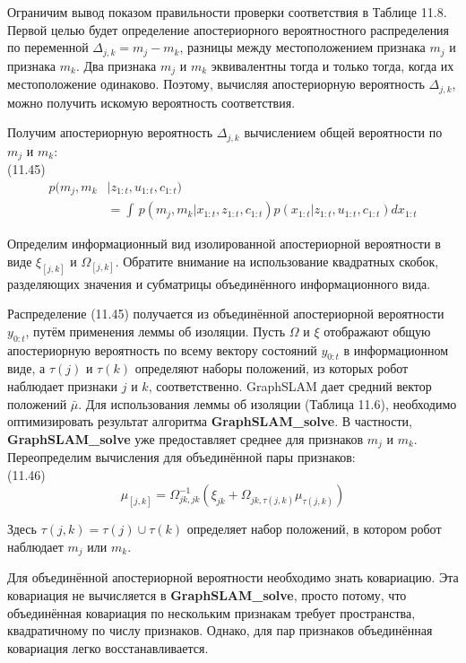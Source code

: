\documentclass[10pt,a4paper]{article}
\begin{document}
Ограничим вывод показом правильности проверки соответствия в Таблице 11.8. Первой целью будет определение апостериорного вероятностного распределения по переменной $\varDelta_{j,k}=m_j-m_k$, разницы между местоположением признака $m_j$ и признака $m_k$. Два признака $m_j$ и $m_k$ эквивалентны тогда и только тогда, когда их местоположение одинаково. Поэтому, вычисляя апостериорную вероятность $\varDelta_{j,k}$, можно получить искомую вероятность соответствия.

Получим апостериорную вероятность $\varDelta_{j,k}$ вычислением общей вероятности по $m_j$ и $m_k$:\\

(11.45)
\begin{equation*}
\begin{split}
p(m_j,m_k&|z_{1:t},u_{1:t},c_{1:t})\\
&=\int\,p(m_j,m_k|x_{1:t},z_{1:t},c_{1:t})p(x_{1:t}|z_{1:t},u_{1:t},c_{1:t})dx_{1:t}
\end{split}
\end{equation*}

Определим информационный вид изолированной апостериорной вероятности в виде $\xi_{[j,k]}$ и $\varOmega_{[j,k]}$. Обратите внимание на использование квадратных скобок, разделяющих значения и субматрицы объединённого информационного вида.

Распределение (11.45) получается из объединённой апостериорной вероятности $y_{0:t}$, путём применения леммы об изоляции. Пусть $\varOmega$ и $\xi$ отображают общую апостериорную вероятность по всему вектору состояний $y_{0:t}$ в информационном виде, а $\tau(j)$ и $\tau(k)$ определяют наборы положений, из которых робот наблюдает признаки $j$ и $k$, соответственно. GraphSLAM дает средний вектор положений $\bar{\mu}$. Для использования леммы об изоляции (Таблица 11.6), необходимо оптимизировать результат алгоритма \textbf{GraphSLAM\_solve}. В частности, \textbf{GraphSLAM\_solve} уже предоставляет среднее для признаков $m_j$ и $m_k$. Переопределим вычисления для объединённой пары признаков:\\

(11.46)
$$\mu_{[j,k]}=\varOmega_{jk,jk}^{-1}(\xi_{jk}+\varOmega_{jk,\tau(j,k)}\mu_{\tau(j,k)})$$

Здесь $\tau(j,k)=\tau(j)\cup\tau(k)$ определяет набор положений, в котором робот наблюдает  $m_j$ или $m_k$.

Для объединённой апостериорной вероятности необходимо знать ковариацию. Эта ковариация не вычисляется в \textbf{GraphSLAM\_solve}, просто потому, что объединённая ковариация по нескольким признакам требует пространства, квадратичному по числу признаков. Однако, для пар признаков объединённая ковариация легко восстанавливается.
\end{document}
